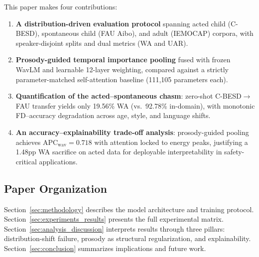 This paper makes four contributions:

\begin{enumerate}
\item \textbf{A distribution-driven evaluation protocol} spanning acted child (C-BESD), spontaneous child (FAU Aibo), and adult (IEMOCAP) corpora, with speaker-disjoint splits and dual metrics (WA and UAR).
\item \textbf{Prosody-guided temporal importance pooling} fused with frozen WavLM and learnable 12-layer weighting, compared against a strictly parameter-matched self-attention baseline (111,105 parameters each).
\item \textbf{Quantification of the acted--spontaneous chasm}: zero-shot C-BESD$\rightarrow$FAU transfer yields only 19.56\% WA (vs.\ 92.78\% in-domain), with monotonic FD--accuracy degradation across age, style, and language shifts.
\item \textbf{An accuracy--explainability trade-off analysis}: prosody-guided pooling achieves APC$_{\text{wav}}{=}0.718$ with attention locked to energy peaks, justifying a 1.48pp WA sacrifice on acted data for deployable interpretability in safety-critical applications.
\end{enumerate}

\subsection{Paper Organization}

Section~\ref{sec:methodology} describes the model architecture and training protocol.
Section~\ref{sec:experiments_results} presents the full experimental matrix.
Section~\ref{sec:analysis_discussion} interprets results through three pillars: distribution-shift failure, prosody as structural regularization, and explainability.
Section~\ref{sec:conclusion} summarizes implications and future work.
